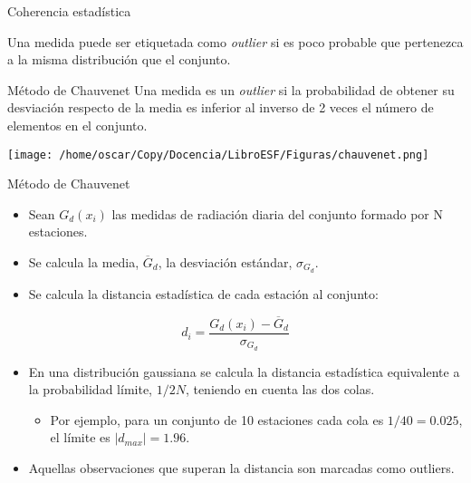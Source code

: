 \documentclass[xcolor={usenames,svgnames,dvipsnames}]{beamer}
\let\cite\parencite
\begin{document}
\begin{frame}[label=sec-3-9]{Coherencia estadística}
\begin{block}{Una medida puede ser etiquetada como \emph{outlier} si es poco probable que pertenezca a la misma distribución que el conjunto.}
\end{block}
\begin{block}{\alert{Método de Chauvenet}}
Una medida es un \emph{outlier} si la probabilidad de obtener su desviación
respecto de la media es inferior al inverso de 2 veces el número de
elementos en el conjunto.

\texttt{[image: /home/oscar/Copy/Docencia/LibroESF/Figuras/chauvenet.png]}
\end{block}
\end{frame}
\begin{frame}[label=sec-3-10]{Método de Chauvenet}
\begin{itemize}
\item Sean $G_d(x_i)$ las medidas de radiación diaria del conjunto formado por N estaciones.
\end{itemize}

\pause

\begin{itemize}
\item Se calcula la media, $\overline{G}_d$, la desviación estándar, $\sigma_{G_d}$.
\end{itemize}

\pause

\begin{itemize}
\item Se calcula la distancia estadística de cada estación al conjunto:
\end{itemize}
\[
d_i = \frac{G_d(x_i) - \overline{G}_d}{\sigma_{G_d}}
\]

\pause

\begin{itemize}
\item En una distribución gaussiana se calcula la distancia estadística
equivalente a la probabilidad límite, $1/2N$, teniendo en cuenta
las dos colas.
\begin{itemize}
\item Por ejemplo, para un conjunto de 10 estaciones cada cola es
      $1/40 = 0.025$, el límite es $\left| d_{max} \right| = 1.96$.
\end{itemize}
\end{itemize}
\pause

\begin{itemize}
\item Aquellas observaciones que superan la distancia son marcadas como outliers.
\end{itemize}

\cite{Perpinan2009}
\end{frame}
\end{document}
